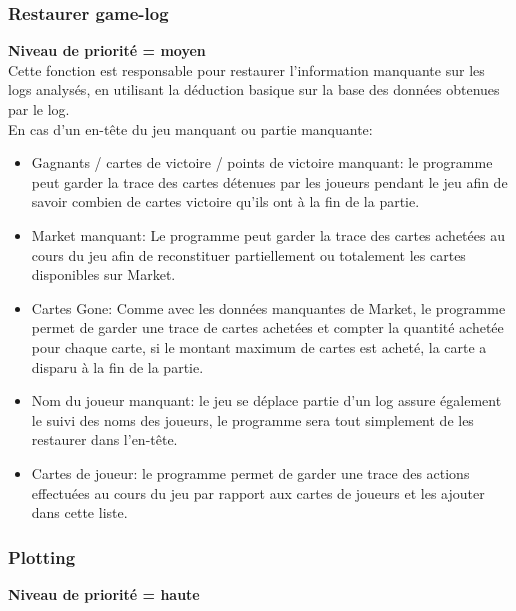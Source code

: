 \subsubsection{Restaurer game-log}
\textbf{Niveau de priorité = moyen}\\

Cette fonction est responsable pour restaurer l'information manquante sur les logs analysés, en utilisant la déduction basique sur la base des données obtenues par le log.\\
En cas d'un en-tête du jeu manquant ou partie manquante:
  \begin{itemize}
\item Gagnants / cartes de victoire / points de victoire manquant: le programme peut garder la trace des cartes détenues par les joueurs pendant le jeu afin de savoir combien de cartes victoire qu'ils ont à la fin de la partie.
\item Market manquant: Le programme peut garder la trace des cartes achetées au cours du jeu afin de reconstituer partiellement ou totalement les cartes disponibles sur Market.
\item Cartes Gone: Comme avec les données manquantes de Market, le programme permet de garder une trace de cartes achetées et compter la quantité achetée pour chaque carte, si le montant maximum de cartes est acheté, la carte a disparu à la fin de la partie.
\item Nom du joueur manquant: le jeu se déplace partie d'un log assure également le suivi des noms des joueurs, le programme sera tout simplement de les restaurer dans l'en-tête.
\item Cartes de joueur: le programme permet de garder une trace des actions effectuées au cours du jeu par rapport aux cartes de joueurs et les ajouter dans cette liste.
  \end{itemize}

\subsubsection{Plotting}
\textbf{Niveau de priorité = haute}\\

